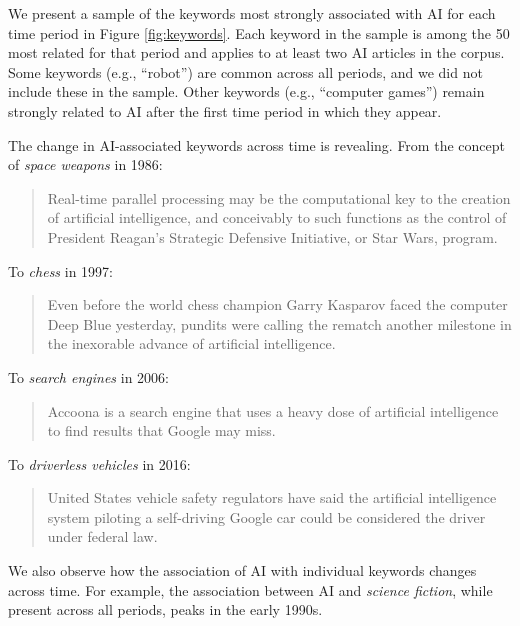 \documentclass[letterpaper]{article}
\begin{document}
We present a sample of the keywords most strongly associated with AI for each time period in Figure \ref{fig:keywords}. Each keyword in the sample is among the 50 most related for that period and applies to at least two AI articles in the corpus. Some keywords (e.g., ``robot'') are common across all periods, and we did not include these in the sample. Other keywords (e.g., ``computer games'') remain strongly related to AI after the first time period in which they appear.

The change in AI-associated keywords across time is revealing. From the concept of \textit{space weapons} in 1986:
\begin{quote}
\small
Real-time parallel processing may be the computational key to the creation of artificial intelligence, and conceivably to such functions as the control of President Reagan's Strategic Defensive Initiative, or Star Wars, program.
\normalsize
\end{quote}
To \textit{chess} in 1997:
\begin{quote}
\small
Even before the world chess champion Garry Kasparov faced the computer Deep Blue yesterday, pundits were calling the rematch another milestone in the inexorable advance of artificial intelligence.
\normalsize
\end{quote}
To \textit{search engines} in 2006:
\begin{quote}
\small
Accoona is a search engine that uses a heavy dose of artificial intelligence to find results that Google may miss.
\normalsize
\end{quote}
To \textit{driverless vehicles} in 2016:
\begin{quote}
\small
United States vehicle safety regulators have said the artificial intelligence system piloting a self-driving Google car could be considered the driver under federal law.
\normalsize
\end{quote}

We also observe how the association of AI with individual keywords changes across time. For example, the association between AI and \textit{science fiction}, while present across all periods, peaks in the early 1990s. %
\end{document}
